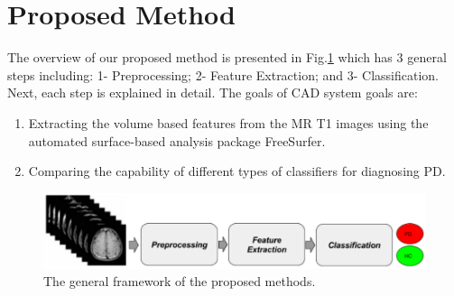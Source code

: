 \documentclass[runningheads,a4paper]{llncs}
\begin{document}
\section{Proposed Method}
The overview of our proposed method is presented in Fig.\ref{fig:framework}  which has $3$ general steps including: 1- Preprocessing; 2- Feature Extraction; and 3- Classification. Next, each step is explained in detail. The goals of CAD system goals are:
\begin{enumerate}
\item Extracting the volume based features from the MR T1 images using the automated surface-based analysis package FreeSurfer.
\item Comparing the capability of different types of classifiers for diagnosing PD.
\end{enumerate}

\begin{figure}[h!]
\includegraphics[scale=0.37]{flchart.png}
\caption{The general framework of the proposed methods.}
\label{fig:framework}
\end{figure}
\end{document}
